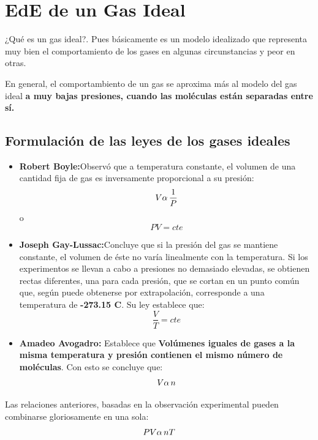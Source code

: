 \documentclass[12pt,twocolumn,a4paper]{report}
\begin{document}
\section*{EdE de un Gas Ideal}
¿Qué es un gas ideal?. Pues básicamente es un modelo idealizado que representa muy bien el comportamiento de los gases en algunas circunstancias y peor en otras. 

En general, el comportambiento de un gas se aproxima más al modelo del gas ideal \textbf{a muy bajas presiones, cuando las moléculas están separadas entre sí.} 

\subsection*{Formulación de las leyes de los gases ideales}
\begin{itemize}
\setlength\itemsep{0.001cm}
\item{\textbf{Robert Boyle:}Observó que a temperatura constante, el volumen de una cantidad fija de gas es inversamente proporcional a su presión:
\begin{equation*}
V \alpha \thinspace \dfrac{1}{P} 
\end{equation*}
o
\begin{equation*}
PV = cte
\end{equation*}}
\item{\textbf{Joseph Gay-Lussac:}Concluye que si la presión del gas se mantiene constante, el volumen de éste no varía linealmente con la temperatura. Si los experimentos se llevan a cabo a presiones no demasiado elevadas, se obtienen rectas diferentes, una para cada presión, que se cortan en un punto común que, según puede obtenerse por extrapolación, corresponde a una temperatura de \textbf{-273.15 C}. Su ley establece que:
\begin{equation*}
\dfrac{V}{T} = cte
\end{equation*}}
\item{\textbf{Amadeo Avogadro:} Establece que \textbf{Volúmenes iguales de gases a la misma temperatura y presión contienen el mismo número de moléculas}. Con esto se concluye que:
\begin{equation*}
V \alpha \thinspace n
\end{equation*}}
\end{itemize}

Las relaciones anteriores, basadas en la observación experimental pueden combinarse gloriosamente en una sola:
\begin{equation*}
PV \alpha \thinspace nT
\end{equation*}
\end{document}
